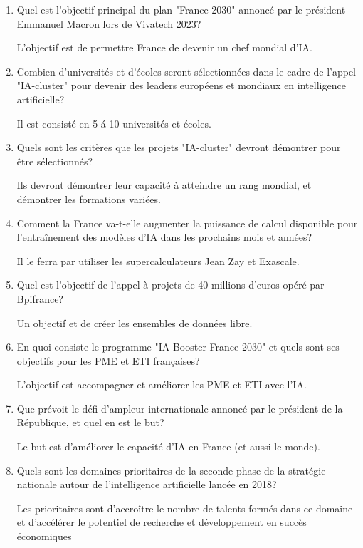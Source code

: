 \documentclass{article}
\begin{document}
\begin{enumerate}
	\item Quel est l'objectif principal du plan "France 2030" annoncé par le
	      président Emmanuel Macron lors de Vivatech 2023?

	      L'objectif est de permettre France de devenir un chef mondial d'IA.

	\item Combien d'universités et d'écoles seront sélectionnées dans le cadre
	      de l'appel "IA-cluster" pour devenir des leaders européens et
	      mondiaux en intelligence artificielle?

	      Il est consisté en 5 á 10 universités et écoles.

	\item Quels sont les critères que les projets "IA-cluster" devront
	      démontrer pour être sélectionnés?

	      Ils devront démontrer leur capacité à atteindre un rang mondial, et
	      démontrer les formations variées.

	\item Comment la France va-t-elle augmenter la puissance de calcul
	      disponible pour l'entraînement des modèles d'IA dans les prochains
	      mois et années?

	      Il le ferra par utiliser les supercalculateurs Jean Zay et Exascale.

	\item Quel est l'objectif de l'appel à projets de 40 millions d'euros opéré
	      par Bpifrance?

	      Un objectif et de créer les ensembles de données libre.

	\item En quoi consiste le programme "IA Booster France 2030" et quels sont
	      ses objectifs pour les PME et ETI françaises?

	      L'objectif est accompagner et améliorer les PME et ETI avec l'IA.

	\item Que prévoit le défi d'ampleur internationale annoncé par le président
	      de la République, et quel en est le but?

	      Le but est d'améliorer le capacité d'IA en France (et aussi le
	      monde).

	\item Quels sont les domaines prioritaires de la seconde phase de la
	      stratégie nationale autour de l'intelligence artificielle lancée en
	      2018?

          Les prioritaires sont d’accroître le nombre de talents formés dans ce
          domaine et d’accélérer le potentiel de recherche et développement en
          succès économiques

\end{enumerate}
\end{document}
